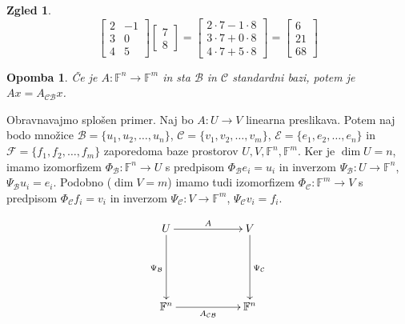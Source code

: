 \documentclass[10pt, a4paper]{article}
\newtheorem*{opomba}{Opomba}
\newtheorem{zgled}{Zgled}[section]
\newcommand{\F}{\mathbb {F}}
\begin{document}
\begin{zgled}
    \begin{equation*}
        \begin{bmatrix}
            2 & -1\\
            3 & 0\\
            4 & 5
        \end{bmatrix} 
        \begin{bmatrix}
            7\\
            8
        \end{bmatrix} =
        \begin{bmatrix}
            2 \cdot 7 - 1 \cdot 8\\
            3 \cdot 7 + 0 \cdot 8\\
            4 \cdot 7 + 5 \cdot 8
        \end{bmatrix} =
        \begin{bmatrix}
            6\\
            21\\
            68
        \end{bmatrix}
    \end{equation*}
\end{zgled}

\begin{opomba}
    Če je $A: \F^n \rightarrow \F^m$ in sta $\mathcal{B}$ in $\mathcal{C}$ standardni bazi, potem je $Ax = A_\mathcal{CB} x$.
\end{opomba}

Obravnavajmo splošen primer. Naj bo $A: U \rightarrow V$ linearna preslikava.
Potem naj bodo množice $\mathcal{B} =\{u_1, u_2, \dots, u_n\}$, $\mathcal{C} =\{v_1, v_2, \dots, v_m\}$, $\mathcal{E} =\{e_1, e_2, \dots, e_n\}$ in $\mathcal{F} =\{f_1, f_2, \dots, f_m\}$
zaporedoma baze prostorov $U, V, \F^n, \F^m$.
Ker je $\dim U = n$, imamo izomorfizem $\Phi_\mathcal{B} : \F^n \rightarrow U$ s predpisom
$\Phi_\mathcal{B} e_i = u_i$ in inverzom $\Psi_\mathcal{B} : U \rightarrow \F^n$, $\Psi_\mathcal{B} u_i = e_i$.
Podobno ($\dim V = m$) imamo tudi izomorfizem $\Phi_\mathcal{C} : \F^m \rightarrow V$ s predpisom
$\Phi_\mathcal{C} f_i = v_i$ in inverzom $\Psi_\mathcal{C} : V \rightarrow \F^m$, $\Psi_\mathcal{C} v_i = f_i$.

\begin{center}
        \begin{displaymath}
            \xymatrixrowsep{2cm}
            \xymatrixcolsep{2cm}
            \xymatrix{ U \ar[r]^{A} \ar[d]_{\Psi_\mathcal{B}} & V \ar[d]^{\Psi_\mathcal{C}} \\
                        \F^n \ar[r]_{A_\mathcal{CB}} & \F^n}
        \end{displaymath}
\end{center}
\end{document}
